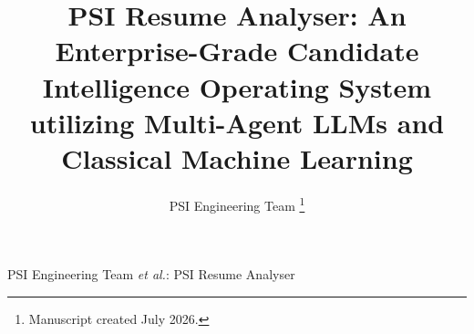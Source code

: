 \documentclass[10pt,journal,compsoc]{IEEEtran}
\begin{document}
\title{PSI Resume Analyser: An Enterprise-Grade Candidate Intelligence Operating System utilizing Multi-Agent LLMs and Classical Machine Learning}

\author{PSI Engineering Team%
%
\thanks{Manuscript created July 2026.}}

%
{PSI Engineering Team \MakeLowercase{\textit{et al.}}: PSI Resume Analyser}



\maketitle

\IEEEpeerreviewmaketitle














\end{document}
